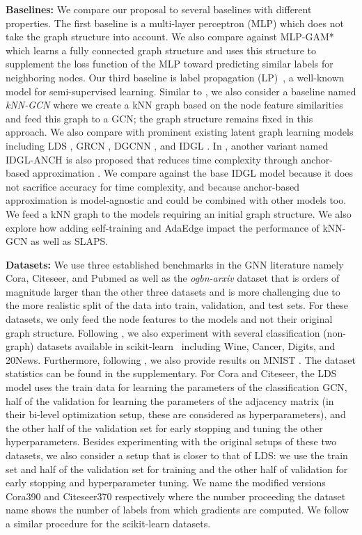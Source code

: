 \documentclass{article}
\begin{document}
\textbf{Baselines:} We compare our proposal to several baselines with different properties. The first baseline is a multi-layer perceptron (MLP) which does not take the graph structure into account. We also compare against MLP-GAM* \citep{stretcu2019graph} which learns a fully connected graph structure and uses this structure to supplement the loss function of the MLP toward predicting similar labels for neighboring nodes. Our third baseline is label propagation (LP)~\citep{zhu2002learning}, a well-known model for semi-supervised learning. 
Similar to \citep{franceschi2019learning}, we also consider a baseline named \emph{kNN-GCN} where we create a kNN graph based on the node feature similarities and feed this graph to a GCN; the graph structure remains fixed in this approach. We also compare with prominent existing latent graph learning models including LDS \citep{franceschi2019learning}, GRCN \citep{GRCN}, DGCNN \citep{DGCNN}, and IDGL \citep{IDGL}. In \citep{IDGL}, another variant named IDGL-ANCH is also proposed that reduces time complexity through anchor-based approximation \cite{anchor-approximation}. We compare against the base IDGL model because it does not sacrifice accuracy for time complexity, and because anchor-based approximation is model-agnostic and could be combined with other models too. We feed a kNN graph to the models requiring an initial graph structure. We also explore how adding self-training and AdaEdge impact the performance of kNN-GCN as well as SLAPS.

\textbf{Datasets:} We use three established benchmarks in the GNN literature namely Cora, Citeseer, and Pubmed \citep{sen2008collective} as well as the \emph{ogbn-arxiv} dataset \citep{hu2020open} that is orders of magnitude larger than the other three datasets and is more challenging due to the more realistic split of the data into train, validation, and test sets. For these datasets, we only feed the node features to the models and not their original graph structure. Following \cite{franceschi2019learning,IDGL}, we also experiment with several classification (non-graph) datasets available in scikit-learn~\citep{pedregosa2011scikit} including Wine, Cancer, Digits, and 20News. Furthermore, following \cite{glcn}, we also provide results on MNIST \cite{lecun2010mnist}. The dataset statistics can be found in the supplementary. For Cora and Citeseer, the LDS model uses the train data for learning the parameters of the classification GCN, half of the validation for learning the parameters of the adjacency matrix (in their bi-level optimization setup, these are considered as hyperparameters), and the other half of the validation set for early stopping and tuning the other hyperparameters. Besides experimenting with the original setups of these two datasets, we also consider a setup that is closer to that of LDS: we use the train set and half of the validation set for training and the other half of validation for early stopping and hyperparameter tuning. We name the modified versions Cora390 and Citeseer370 respectively where the number proceeding the dataset name shows the number of labels from which gradients are computed.
We follow a similar procedure for the scikit-learn datasets.
\end{document}

